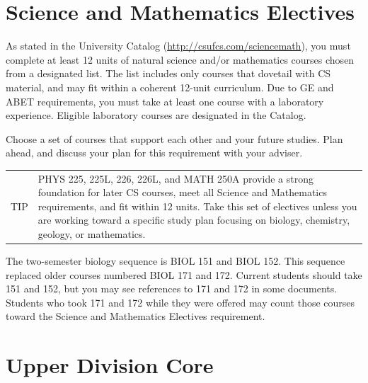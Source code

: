 \documentclass{book}
\newenvironment{tip}{
  \tcolorbox \begin{tabular}{m{.5in} m{5.25in}}
    \Large{TIP} &
}{
  \end{tabular} \endtcolorbox
}
\newcommand{\shrunkurl}[1]{\url{http://csufcs.com/#1}}
\begin{document}
\section{Science and Mathematics Electives}

As stated in the University Catalog (\shrunkurl{sciencemath}), you
must complete at least 12 units of natural science and/or mathematics
courses chosen from a designated list. The list includes only courses
that dovetail with CS material, and may fit within a coherent 12-unit
curriculum. Due to GE and ABET requirements, you must take at least
one course with a laboratory experience. Eligible laboratory courses
are designated in the Catalog.

Choose a set of courses that support each other and your future
studies. Plan ahead, and discuss your plan for this requirement with
your adviser.

\begin{tip}
PHYS 225, 225L, 226, 226L, and MATH 250A provide a strong foundation
for later CS courses, meet all Science and Mathematics requirements,
and fit within 12 units. Take this set of electives unless you are
working toward a specific study plan focusing on biology, chemistry,
geology, or mathematics.
\end{tip}



The two-semester biology sequence is BIOL 151 and BIOL 152. This
sequence replaced older courses numbered BIOL 171 and 172. Current
students should take 151 and 152, but you may see references to 171
and 172 in some documents. Students who took 171 and 172 while they
were offered may count those courses toward the Science and
Mathematics Electives requirement.

\section{Upper Division Core}
\end{document}
